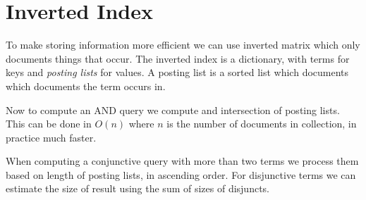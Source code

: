 \documentclass[a5paper]{report}
\begin{document}
\section{Inverted Index}
To make storing information more efficient we can use inverted matrix which only documents things that occur.
The inverted index is a dictionary, with terms for keys and \emph{posting lists} for values.
A posting list is a sorted list which documents which documents the term occurs in.

Now to compute an AND query we compute and intersection of posting lists.
This can be done in $O(n)$ where $n$ is the number of documents in collection, in practice much faster.

When computing a conjunctive query with more than two terms we process them based on length of posting lists, in ascending order.
For disjunctive terms we can estimate the size of result using the sum of sizes of disjuncts.
\end{document}
